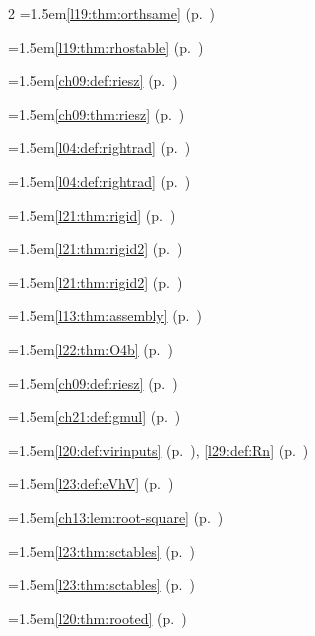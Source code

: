 \begin{multicols}{2}
\hangindent=1.5em\quad \ref{l19:thm:orthsame} (p.~\pageref{l19:thm:orthsame})\par
\hangindent=1.5em\quad \ref{l19:thm:rhostable} (p.~\pageref{l19:thm:rhostable})\par
\hangindent=1.5em\quad \ref{ch09:def:riesz} (p.~\pageref{ch09:def:riesz})\par
\hangindent=1.5em\quad \ref{ch09:thm:riesz} (p.~\pageref{ch09:thm:riesz})\par
\hangindent=1.5em\quad \ref{l04:def:rightrad} (p.~\pageref{l04:def:rightrad})\par
\hangindent=1.5em\quad \ref{l04:def:rightrad} (p.~\pageref{l04:def:rightrad})\par
\hangindent=1.5em\quad \ref{l21:thm:rigid} (p.~\pageref{l21:thm:rigid})\par
\hangindent=1.5em\quad \ref{l21:thm:rigid2} (p.~\pageref{l21:thm:rigid2})\par
\hangindent=1.5em\quad \ref{l21:thm:rigid2} (p.~\pageref{l21:thm:rigid2})\par
\hangindent=1.5em\quad \ref{l13:thm:assembly} (p.~\pageref{l13:thm:assembly})\par
\hangindent=1.5em\quad \ref{l22:thm:O4b} (p.~\pageref{l22:thm:O4b})\par
\hangindent=1.5em\quad \ref{ch09:def:riesz} (p.~\pageref{ch09:def:riesz})\par
\hangindent=1.5em\quad \ref{ch21:def:gmul} (p.~\pageref{ch21:def:gmul})\par
\hangindent=1.5em\quad \ref{l20:def:virinputs} (p.~\pageref{l20:def:virinputs}), \ref{l29:def:Rn} (p.~\pageref{l29:def:Rn})\par
\hangindent=1.5em\quad \ref{l23:def:eVhV} (p.~\pageref{l23:def:eVhV})\par
\hangindent=1.5em\quad \ref{ch13:lem:root-square} (p.~\pageref{ch13:lem:root-square})\par
\hangindent=1.5em\quad \ref{l23:thm:sctables} (p.~\pageref{l23:thm:sctables})\par
\hangindent=1.5em\quad \ref{l23:thm:sctables} (p.~\pageref{l23:thm:sctables})\par
\hangindent=1.5em\quad \ref{l20:thm:rooted} (p.~\pageref{l20:thm:rooted})\par

\end{multicols}
